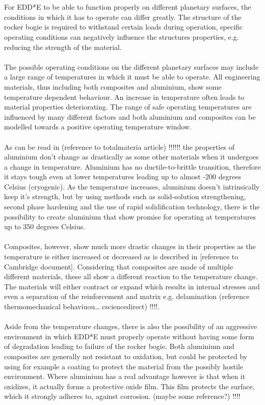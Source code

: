 \\
\\
For EDD*E to be able to function properly on different planetary surfaces, the conditions in which it has to operate can differ greatly. The structure of the rocker bogie is required to withstand certain loads during operation, specific operating conditions can negatively influence the structures properties, e.g. reducing the strength of the material. 
\\
\\
The possible operating conditions on the different planetary surfaces may include a large range of temperatures in which it must be able to operate. All engineering materials, thus including both composites and aluminium, show some temperature dependent behaviour. An increase in temperature often leads to material properties deteriorating. The range of safe operating temperatures are influenced by many different factors and both aluminium and composites can be modelled towards a positive operating temperature window.
\\
\\
As can be read in (reference to totalmateria article)     !!!!!!      the properties of aluminium don’t change as drastically as some other materials when it undergoes a change in temperature. Aluminium has no ductile-to-brittle transition, therefore it stays tough even at lower temperatures leading up to almost  -200 degrees Celsius (cryogenic). As the temperature increases, aluminium doesn’t intrinsically keep it’s strength, but by using methods such as solid-solution strengthening, second phase hardening and the use of rapid solidification technology, there is the possibility to create aluminium that show promise for operating at temperatures up to 350 degrees Celsius.
\\
\\
Composites, however, show much more drastic changes in their properties as the temperature is either increased or decreased as is described in [reference to Cambridge document]. Considering that composites are made of multiple different materials, these all show a different reaction to the temperature change. The materials will either contract or expand which results in internal stresses and even a separation of the reinforcement and matrix e.g. delamination (reference thermomechanical behaviuou… csciencedirect)     !!!!.
\\
\\
Aside from the temperature changes, there is also the possibility of an aggressive environment in which EDD*E must properly operate without having some form of degradation leading to failure of the rocker bogie. Both aluminium and composites are generally not resistant to oxidation, but could be protected by using for example a coating to protect the material from the possibly hostile environment. Where aluminium has a real advantage however is that when it oxidizes, it actually forms a protective oxide film. This film protects the surface, which it strongly adheres to, against corrosion. (maybe some reference?)       !!!!
